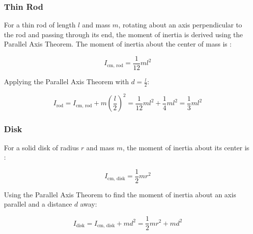 \subsubsection{Thin Rod}
For a thin rod of length \(l\) and mass \(m\), rotating about an axis perpendicular to the rod and passing through its end, the moment of inertia is derived using the Parallel Axis Theorem. The moment of inertia about the center of mass is \cite{taylor_mechanics}:

\begin{equation}
\label{eq:rod_cm_inertia}
I_{\text{cm, rod}} = \frac{1}{12}ml^2
\end{equation}

Applying the Parallel Axis Theorem with \(d = \frac{l}{2}\):

\begin{equation}
\label{eq:rod_total_inertia}
I_{\text{rod}} = I_{\text{cm, rod}} + m\left(\frac{l}{2}\right)^2 = \frac{1}{12}ml^2 + \frac{1}{4}ml^2 = \frac{1}{3}ml^2
\end{equation}

\subsubsection{Disk}
For a solid disk of radius \(r\) and mass \(m\), the moment of inertia about its center is \cite{taylor_mechanics}:

\begin{equation}
\label{eq:disk_cm_inertia}
I_{\text{cm, disk}} = \frac{1}{2}mr^2
\end{equation}

Using the Parallel Axis Theorem to find the moment of inertia about an axis parallel and a distance \(d\) away:

\begin{equation}
\label{eq:disk_total_inertia}
I_{\text{disk}} = I_{\text{cm, disk}} + md^2 = \frac{1}{2}mr^2 + md^2
\end{equation}




